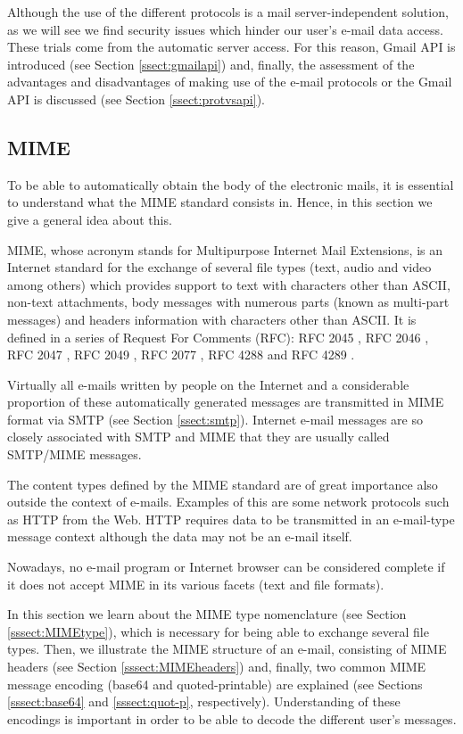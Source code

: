 Although the use of the different protocols is a mail server-independent solution, as we will see we find security issues which hinder our user's e-mail data access. These trials come from the automatic server access. For this reason, Gmail API is introduced (see Section \ref{ssect:gmailapi}) and, finally, the assessment of the advantages and disadvantages of making use of the e-mail protocols or the Gmail API is discussed (see Section \ref{ssect:protvsapi}).

\subsection{MIME} \label{ssect:mime}
To be able to automatically obtain the body of the electronic mails, it is essential to understand what the MIME standard consists in. Hence, in this section we give a general idea about this.

MIME, whose acronym stands for Multipurpose Internet Mail Extensions, is an Internet standard for the exchange of several file types (text, audio and video among others) which provides support to text with characters other than ASCII, non-text attachments, body messages with numerous parts (known as multi-part messages) and headers information with characters other than ASCII. It is defined in a series of Request For Comments (RFC): RFC 2045 \citep{rfc2045}, RFC 2046 \citep{rfc2046}, RFC 2047 \citep{rfc2047}, RFC 2049 \citep{rfc2049}, RFC 2077 \citep{rfc2077}, RFC 4288 \citep{rfc4288} and RFC 4289 \citep{rfc4289}.

Virtually all e-mails written by people on the Internet and a considerable proportion of these automatically generated messages are transmitted in MIME format via SMTP (see Section \ref{ssect:smtp}). Internet e-mail messages are so closely associated with SMTP and MIME that they are usually called SMTP/MIME messages.

The content types defined by the MIME standard are of great importance also outside the context of e-mails. Examples of this are some network protocols such as HTTP from the Web. HTTP requires data to be transmitted in an e-mail-type message context although the data may not be an e-mail itself.

Nowadays, no e-mail program or Internet browser can be considered complete if it does not accept MIME in its various facets (text and file formats).

In this section we learn about the MIME type nomenclature (see Section \ref{sssect:MIMEtype}), which is necessary for being able to exchange several file types. Then, we illustrate the MIME structure of an e-mail, consisting of MIME headers (see Section \ref{sssect:MIMEheaders}) and, finally, two common MIME message encoding (base64 and quoted-printable) are explained (see Sections \ref{sssect:base64} and \ref{sssect:quot-p}, respectively). Understanding of these encodings is important in order to be able to decode the different user's messages.


